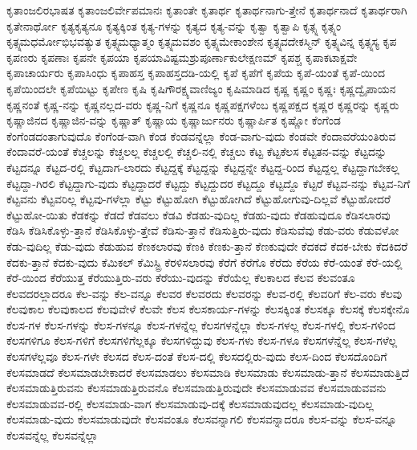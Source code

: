 {ಕೃತಾಂಜಲಿರಭಾಷತ
ಕೃತಾಂಜಲಿರ್ವೇಪಮಾನಃ
ಕೃತಾಂತೇ
ಕೃತಾರ್ಥ
ಕೃತಾರ್ಥನಾಗು-ತ್ತೇನೆ
ಕೃತಾರ್ಥನಾದೆ
ಕೃತಾರ್ಥರಾಗಿ
ಕೃತೇನಾರ್ಥೋ
ಕೃತ್ಯಕೃತ್ಯನೂ
ಕೃತ್ಯಕ್ಕಿಂತ
ಕೃತ್ಯ-ಗಳನ್ನು
ಕೃತ್ಯದ
ಕೃತ್ಯ-ವನ್ನು
ಕೃತ್ವಾ
ಕೃತ್ವಾಪಿ
ಕೃತ್ಸ್ನ
ಕೃತ್ಸ್ನಂ
ಕೃತ್ಸ್ನಮಧರ್ಮೋಭಿಭವತ್ಯುತ
ಕೃತ್ಸ್ನಮಧ್ಯಾತ್ಮಂ
ಕೃತ್ಸ್ನಮವಶಂ
ಕೃತ್ಸ್ನಮೇಕಾಂಶೇನ
ಕೃತ್ಸ್ನವದೇಕಸ್ಮಿನ್
ಕೃತ್ಸ್ನವಿನ್ನ
ಕೃತ್ಸ್ನಸ್ಯ
ಕೃಪ
ಕೃಪಣರು
ಕೃಪಣಾಃ
ಕೃಪನೇ
ಕೃಪಯಾ
ಕೃಪಯಾವಿಷ್ಟಮಶ್ರುಪೂರ್ಣಾಕುಲೇಕ್ಷಣಮ್
ಕೃಪಶ್ಚ
ಕೃಪಾಕಟಾಕ್ಷವೇ
ಕೃಪಾಚಾರ್ಯರು
ಕೃಪಾಸಿಂಧು
ಕೃಪಾಹಸ್ತ
ಕೃಪಾಹಸ್ತದಡಿ-ಯಲ್ಲಿ
ಕೃಪೆ
ಕೃಪೆಗೆ
ಕೃಪೆಯ
ಕೃಪೆ-ಯಂತೆ
ಕೃಪೆ-ಯಿಂದ
ಕೃಪೆಯಿಂದಲೇ
ಕೃಪೆಯಿಟ್ಟು
ಕೃಪೇಣ
ಕೃಷಿ
ಕೃಷಿಗೌರಕ್ಷ್ಯವಾಣಿಜ್ಯಂ
ಕೃಷಿಮಾಡಿದ
ಕೃಷ್ಣ
ಕೃಷ್ಣಂ
ಕೃಷ್ಣಃ
ಕೃಷ್ಣದ್ವೈಪಾಯನ
ಕೃಷ್ಣನಂತೆ
ಕೃಷ್ಣ-ನನ್ನು
ಕೃಷ್ಣನಲ್ಲದ-ವರು
ಕೃಷ್ಣ-ನಿಗೆ
ಕೃಷ್ಣನೂ
ಕೃಷ್ಣಪಕ್ಷಗಳೆಂಬ
ಕೃಷ್ಣಪಕ್ಷದ
ಕೃಷ್ಣರ
ಕೃಷ್ಣರನ್ನು
ಕೃಷ್ಣರು
ಕೃಷ್ಣಾಜಿನದ
ಕೃಷ್ಣಾಜಿನ-ವನ್ನು
ಕೃಷ್ಣಾತ್
ಕೃಷ್ಣಾಯ
ಕೃಷ್ಣಾರ್ಜುನರು
ಕೃಷ್ಣಾರ್ಪಿತ
ಕೃಷ್ಣೋ
ಕೆಂಗೆಂಡ
ಕೆಂಗೆಂಡದಂತಾಗುವುದೊ
ಕೆಂಗೆಂಡ-ವಾಗಿ
ಕೆಂಡ
ಕೆಂಡವನ್ನೆಲ್ಲಾ
ಕೆಂಡ-ವಾಗು-ವುದು
ಕೆಂಡವೇ
ಕೆಂದಾವರೆಯಂತಿರುವ
ಕೆಂದಾವರೆ-ಯಂತೆ
ಕೆಚ್ಚಲನ್ನು
ಕೆಚ್ಚಲಲ್ಲ
ಕೆಚ್ಚಲಲ್ಲಿ
ಕೆಚ್ಚಲಿ-ನಲ್ಲಿ
ಕೆಚ್ಚಲು
ಕೆಟ್ಟ
ಕೆಟ್ಟಕೆಲಸ
ಕೆಟ್ಟತನ-ವನ್ನು
ಕೆಟ್ಟದನ್ನು
ಕೆಟ್ಟದನ್ನೂ
ಕೆಟ್ಟದ-ರಲ್ಲಿ
ಕೆಟ್ಟದಾಗ-ಲಾರದು
ಕೆಟ್ಟದ್ದಕ್ಕೆ
ಕೆಟ್ಟದ್ದನ್ನು
ಕೆಟ್ಟದ್ದನ್ನೇ
ಕೆಟ್ಟದ್ದ-ರಿಂದ
ಕೆಟ್ಟದ್ದಲ್ಲ
ಕೆಟ್ಟದ್ದಾಗಬೇಕಲ್ಲ
ಕೆಟ್ಟದ್ದಾ-ಗಿರಲಿ
ಕೆಟ್ಟದ್ದಾಗು-ವುದು
ಕೆಟ್ಟದ್ದಾದರೆ
ಕೆಟ್ಟದ್ದು
ಕೆಟ್ಟದ್ದುದರ
ಕೆಟ್ಟದ್ದೂ
ಕೆಟ್ಟದ್ದೊ
ಕೆಟ್ಟರೆ
ಕೆಟ್ಟವ-ನನ್ನು
ಕೆಟ್ಟವ-ನಿಗೆ
ಕೆಟ್ಟವನು
ಕೆಟ್ಟವರಿಲ್ಲ
ಕೆಟ್ಟವು-ಗಳೆಲ್ಲಾ
ಕೆಟ್ಟು
ಕೆಟ್ಟುಹೋಗಿ
ಕೆಟ್ಟುಹೋಗಿದೆ
ಕೆಟ್ಟುಹೋಗುವು-ದಿಲ್ಲವೆ
ಕೆಟ್ಟುಹೋದರೆ
ಕೆಟ್ಟುಹೋ-ಯಿತು
ಕೆಡಕನ್ನು
ಕೆಡದೆ
ಕೆಡವಲು
ಕೆಡವಿ
ಕೆಡಹು-ವುದಿಲ್ಲ
ಕೆಡಹು-ವುದು
ಕೆಡಹುವುದೂ
ಕೆಡಿಸಲಾರವು
ಕೆಡಿಸಿ
ಕೆಡಿಸಿಕೊಳ್ಳು-ತ್ತಾನೆ
ಕೆಡಿಸಿಕೊಳ್ಳು-ತ್ತೇವೆ
ಕೆಡಿಸು-ತ್ತಾನೆ
ಕೆಡಿಸುತ್ತಿರು-ವುದು
ಕೆಡಿಸುವೆವು
ಕೆಡು-ವರು
ಕೆಡುವಳೋ
ಕೆಡು-ವುದಿಲ್ಲ
ಕೆಡು-ವುದು
ಕೆಡುಹುವ
ಕೆಣಕಲಾರವು
ಕೆಣಕಿ
ಕೆಣಕು-ತ್ತಾನೆ
ಕೆಣಕುವುದೇ
ಕೆದಕದೆ
ಕೆದಕ-ಬೇಕು
ಕೆದಕಿದರೆ
ಕೆದಕು-ತ್ತಾನೆ
ಕೆದಕು-ವುದು
ಕೆಮಿಕಲ್
ಕೆಮಿಸ್ಟ್ರಿ
ಕೆರಳಿಸಲಾರವು
ಕೆರೆಗೆ
ಕೆರೆಗೊ
ಕೆರೆದು
ಕೆರೆಯ
ಕೆರೆ-ಯಂತೆ
ಕೆರೆ-ಯಲ್ಲಿ
ಕೆರೆ-ಯಿಂದ
ಕೆರೆಯುತ್ತ
ಕೆರೆಯುತ್ತಿರು-ವರು
ಕೆರೆಯು-ವುದನ್ನು
ಕೆರೆಯೆಲ್ಲ
ಕೆಲಕಾಲದ
ಕೆಲವ
ಕೆಲವಂತೂ
ಕೆಲವದರಲ್ಲಾದರೂ
ಕೆಲ-ವನ್ನು
ಕೆಲ-ವನ್ನೂ
ಕೆಲವರ
ಕೆಲವರದು
ಕೆಲವರನ್ನು
ಕೆಲವ-ರಲ್ಲಿ
ಕೆಲವರಿಗೆ
ಕೆಲ-ವರು
ಕೆಲವು
ಕೆಲವುಕಾಲ
ಕೆಲವುಕಾಲದ
ಕೆಲವುವೇಳೆ
ಕೆಲವೇ
ಕೆಲಸ
ಕೆಲಸಕಾರ್ಯ-ಗಳನ್ನು
ಕೆಲಸಕ್ಕಿಂತ
ಕೆಲಸಕ್ಕೂ
ಕೆಲಸಕ್ಕೆ
ಕೆಲಸಕ್ಕೇನೊ
ಕೆಲಸ-ಗಳ
ಕೆಲಸ-ಗಳನ್ನು
ಕೆಲಸ-ಗಳನ್ನೂ
ಕೆಲಸ-ಗಳನ್ನೆಲ್ಲ
ಕೆಲಸಗಳನ್ನೆಲ್ಲಾ
ಕೆಲಸ-ಗಳಲ್ಲ
ಕೆಲಸ-ಗಳಲ್ಲಿ
ಕೆಲಸ-ಗಳಿಂದ
ಕೆಲಸಗಳಿಗೂ
ಕೆಲಸ-ಗಳಿಗೆ
ಕೆಲಸಗಳಿಗೆಲ್ಲಕ್ಕೂ
ಕೆಲಸಗಳಿದ್ದುವು
ಕೆಲಸ-ಗಳು
ಕೆಲಸ-ಗಳೂ
ಕೆಲಸಗಳೆನ್ನೆಲ್ಲ
ಕೆಲಸ-ಗಳೆಲ್ಲ
ಕೆಲಸಗಳೆಲ್ಲವೂ
ಕೆಲಸ-ಗಳೇ
ಕೆಲಸದ
ಕೆಲಸ-ದಂತೆ
ಕೆಲಸ-ದಲ್ಲಿ
ಕೆಲಸದಲ್ಲಿರು-ವುದು
ಕೆಲಸ-ದಿಂದ
ಕೆಲಸದೊಂದಿಗೆ
ಕೆಲಸಮಾಡದೆ
ಕೆಲಸಮಾಡಬೇಕಾದರೆ
ಕೆಲಸಮಾಡಲು
ಕೆಲಸಮಾಡಿ
ಕೆಲಸಮಾಡು
ಕೆಲಸಮಾಡು-ತ್ತಾನೆ
ಕೆಲಸಮಾಡುತ್ತಿದೆ
ಕೆಲಸಮಾಡುತ್ತಿರುವನು
ಕೆಲಸಮಾಡುತ್ತಿರುವನೊ
ಕೆಲಸಮಾಡುತ್ತಿರುವುದೇ
ಕೆಲಸಮಾಡುವವ
ಕೆಲಸಮಾಡುವವನು
ಕೆಲಸಮಾಡುವವ-ರಲ್ಲಿ
ಕೆಲಸಮಾಡು-ವಾಗ
ಕೆಲಸಮಾಡುವು-ದಕ್ಕೆ
ಕೆಲಸಮಾಡುವುದಲ್ಲ
ಕೆಲಸಮಾಡು-ವುದಿಲ್ಲ
ಕೆಲಸಮಾಡು-ವುದು
ಕೆಲಸಮಾಡುವುದೇ
ಕೆಲಸವಂತೂ
ಕೆಲಸವನ್ನಾಗಲಿ
ಕೆಲಸವನ್ನಾದರೂ
ಕೆಲಸ-ವನ್ನು
ಕೆಲಸ-ವನ್ನೂ
ಕೆಲಸವನ್ನೆಲ್ಲ
ಕೆಲಸವನ್ನೆಲ್ಲಾ
}
